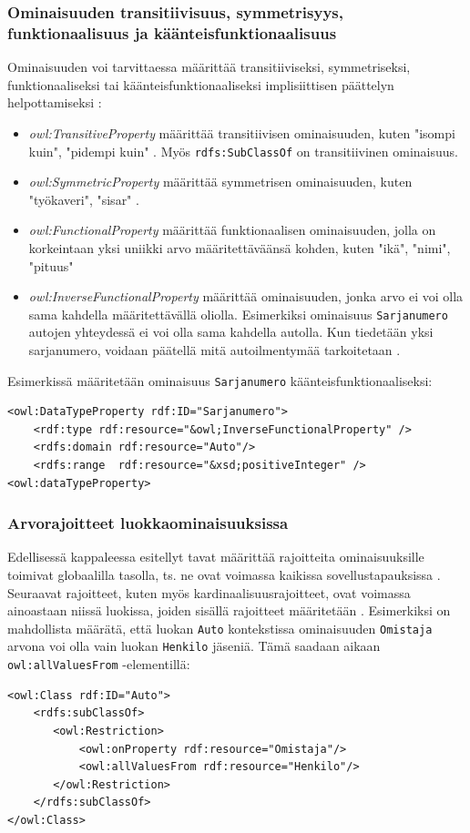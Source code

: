 \documentclass[finnish]{tktltiki2}
\theoremstyle{definition}
\theoremstyle{remark}
\begin{document}
\subsubsection{Ominaisuuden transitiivisuus, symmetrisyys, funktionaalisuus ja käänteisfunktionaalisuus}
Ominaisuuden voi tarvittaessa määrittää transitiiviseksi, symmetriseksi, funktionaaliseksi tai käänteisfunktionaaliseksi implisiittisen päättelyn helpottamiseksi \cite{AH09}:

\begin{itemize}
 \item \textit{owl:TransitiveProperty} määrittää transitiivisen ominaisuuden, kuten "isompi kuin", "pidempi kuin" \cite{AH09}. Myös \texttt{rdfs:SubClassOf} on transitiivinen ominaisuus. 
 \item \textit{owl:SymmetricProperty} määrittää symmetrisen ominaisuuden, kuten "työkaveri", "sisar" \cite{AH09}.
 \item \textit{owl:FunctionalProperty} määrittää funktionaalisen ominaisuuden, jolla on korkeintaan yksi uniikki arvo määritettäväänsä kohden, kuten "ikä", "nimi", "pituus" \cite{AH09}
 \item \textit{owl:InverseFunctionalProperty} määrittää ominaisuuden, jonka arvo ei voi olla sama kahdella määritettävällä oliolla. Esimerkiksi ominaisuus \texttt{Sarjanumero} autojen yhteydessä ei voi olla sama kahdella autolla. Kun tiedetään yksi sarjanumero, voidaan päätellä mitä autoilmentymää tarkoitetaan \cite{AH09}.
\end{itemize}
Esimerkissä määritetään ominaisuus \texttt{Sarjanumero} käänteisfunktionaaliseksi:
\begin{verbatim}
<owl:DataTypeProperty rdf:ID="Sarjanumero">
    <rdf:type rdf:resource="&owl;InverseFunctionalProperty" />
    <rdfs:domain rdf:resource="Auto"/>
    <rdfs:range  rdf:resource="&xsd;positiveInteger" />   
<owl:dataTypeProperty>
\end{verbatim}

\subsubsection{Arvorajoitteet luokkaominaisuuksissa}
Edellisessä kappaleessa esitellyt tavat määrittää rajoitteita ominaisuuksille toimivat globaalilla tasolla, ts. ne ovat voimassa kaikissa sovellustapauksissa \cite{SWM04}. Seuraavat rajoitteet, kuten myös kardinaalisuusrajoitteet, ovat voimassa ainoastaan niissä luokissa, joiden sisällä rajoitteet määritetään \cite{SWM04}. Esimerkiksi on mahdollista määrätä, että luokan \texttt{Auto} kontekstissa ominaisuuden \texttt{Omistaja} arvona voi olla vain luokan \texttt{Henkilo} jäseniä. Tämä saadaan aikaan \texttt{owl:allValuesFrom} -elementillä:
\begin{verbatim}
<owl:Class rdf:ID="Auto">
    <rdfs:subClassOf>
       <owl:Restriction>
           <owl:onProperty rdf:resource="Omistaja"/>
           <owl:allValuesFrom rdf:resource="Henkilo"/>
       </owl:Restriction>        
    </rdfs:subClassOf>
</owl:Class>    
\end{verbatim}
\end{document}
